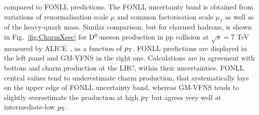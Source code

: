compared to FONLL predictions.
The FONLL uncertainty band is obtained from variations of 
renormalisation scale $\mu$ and common factorisation
scale $\mu_f$ as well as of the heavy-quark mass.
Similar comparison, but for charmed hadrons, is shown in Fig.~\ref{fig:CharmXsec} 
for ${\rm D^0}$-meson production
in pp collision at $\sqrt{s} = 7$ TeV measured by 
ALICE~\cite{Acharya:2017jgo}, as a function of $p_{\rm T}$. FONLL 
predictions are displayed in the left panel and GM-VFNS in the right one. 
Calculations are in agreement with bottom and charm production 
at the LHC, within their
uncertainties. FONLL central values tend to underestimate charm production, 
that systematically lays on the upper edge of FONLL uncertainty band, 
whereas GM-VFNS tends to slightly overestimate the production 
at high $p_{\rm T}$ but agrees very well at intermediate-low $p_{\rm T}$. \\



